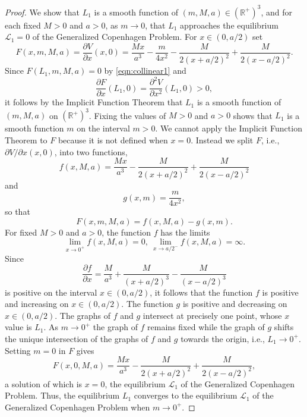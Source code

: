\documentclass[12pt]{article}
\begin{document}
\begin{proof}
We show that $L_1$ is a smooth function of $(m,M,a)\in({\mathbb R}^+)^3$, and for each fixed $M>0$ and $a>0$, as $m\to 0$, that $L_1$ approaches the equilibrium ${\mathcal L}_1=0$ of the Generalized Copenhagen Problem. For $x\in(0,a/2)$ set
\[ F(x,m,M,a) = \frac{\partial V}{\partial x}(x,0) = \frac{Mx}{a^3} - \frac{m}{4x^2} - \frac{M}{2(x+a/2)^2} + \frac{M}{2(x-a/2)^2}.\]
Since $F(L_1,m,M,a) = 0$ by \eqref{eqn:collinear1} and
\[ \frac{\partial F}{\partial x} (L_1,0) = \frac{\partial^2 V}{\partial x^2}(L_1,0) > 0,\]
it follows by the Implicit Function Theorem that $L_1$ is a smooth function of $(m,M,a)$ on $({\mathbb R}^+)^3$. Fixing the values of $M>0$ and $a>0$ shows that $L_1$ is a smooth function $m$ on the interval $m>0$. We cannot apply the Implicit Function Theorem to $F$ because it is not defined when $x=0$. Instead we split $F$, i.e., $\partial V/\partial x(x,0)$, into two functions,
\[ f(x,M,a) = \frac{Mx}{a^3} - \frac{M}{2(x+a/2)^2} + \frac{M}{2(x-a/2)^2}\]
and
\[ g(x,m) = \frac{m}{4x^2},\]
so that
\[ F(x,m,M,a) = f(x,M,a) - g(x,m).\]
For fixed $M>0$ and $a>0$, the function $f$ has the limits
\[ \lim_{x\to 0^+} f(x,M,a) = 0, \ \lim_{x\to a/2^-} f(x,M,a) = \infty.\]
Since
\[ \frac{\partial f}{\partial x} = \frac{M}{a^3} + \frac{M}{(x + a/2)^3 }- \frac{M}{(x-a/2)^3}\]
is positive on the interval $x\in(0,a/2)$, it follows that the function $f$ is positive and increasing on $x\in (0,a/2)$. The function $g$ is positive and decreasing on $x\in(0,a/2)$. The graphs of $f$ and $g$ intersect at precisely one point, whose $x$ value is $L_1$. As $m\to 0^+$ the graph of $f$ remains fixed while the graph of $g$ shifts the unique intersection of the graphs of $f$ and $g$ towards the origin, i.e., $L_1\to 0^+$. Setting $m=0$ in $F$ gives
\[ F(x,0,M,a) = \frac{Mx}{a^3} - \frac{M}{2(x+a/2)^2} + \frac{M}{2(x-a/2)^2},\]
a solution of which is $x=0$, the equilibrium  ${\mathcal L}_1$ of the Generalized Copenhagen Problem. Thus, the equilibrium $L_1$ converges to the equilibrium ${\mathcal L}_1$ of the Generalized Copenhagen Problem when $m\to 0^+$.


\end{proof}
\end{document}
